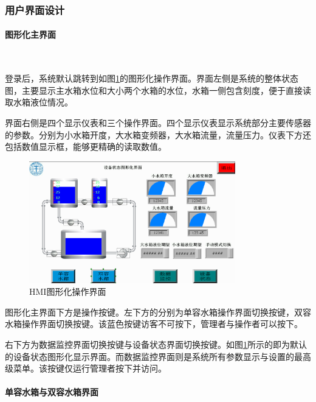 \documentclass[UTF8]{article}
\begin{document}
\subsubsection{用户界面设计}
\paragraph{图形化主界面}~{}

登录后，系统默认跳转到如图\ref{fig:img6}的图形化操作界面。界面左侧是系统的整体状态图，主要显示主水箱水位和大小两个水箱的水位，水箱一侧包含刻度，便于直接读取水箱液位情况。

界面右侧是四个显示仪表和三个操作界面。四个显示仪表显示系统部分主要传感器的参数。分别为小水箱开度，大水箱变频器，大水箱流量，流量压力。仪表下方还包括数值显示框，能够更精确的读取数值。
\begin{figure}[H]
    \centering %
    \includegraphics[width=0.8\textwidth]{figure/HMI图形化操作界面.png} 
    \caption{HMI图形化操作界面} %
    \label{fig:img6} %
\end{figure}

图形化主界面下方是操作按键。左下方的分别为单容水箱操作界面切换按键，双容水箱操作界面切换按键。该蓝色按键访客不可按下，管理者与操作者可以按下。

右下方为数据监控界面切换按键与设备状态界面切换按键。如图\ref{fig:img6}所示的即为默认的设备状态图形化显示界面。而数据监控界面则是系统所有参数显示与设置的最高级菜单。该按键仅运行管理者按下并访问。

\paragraph{单容水箱与双容水箱界面}~{}
\end{document}
